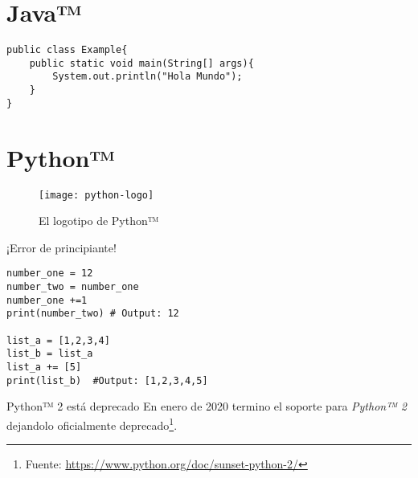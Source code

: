 \section{Java™}

\lipsum[2-3]

\begin{lstlisting}[frame=single]
public class Example{
    public static void main(String[] args){
        System.out.println("Hola Mundo");
    }
}
\end{lstlisting}

\lipsum[1-2]

\section{Python™}

\lipsum[1-2]

\begin{figure}[!htb]
    \centering
    \texttt{[image: python-logo]}
    \caption{El logotipo de Python™}
    \label{fig_u1_3}
\end{figure}


\lipsum[2-3]

\separation
\begin{alertblock}{¡Error de principiante!}
    \begin{lstlisting}[frame=single]
number_one = 12
number_two = number_one
number_one +=1
print(number_two) # Output: 12

list_a = [1,2,3,4]
list_b = list_a
list_a += [5]
print(list_b)  #Output: [1,2,3,4,5]

    \end{lstlisting}
\end{alertblock}

\separation
\lipsum[2-3]

\separation
\begin{infoblock}{Python™ 2 está deprecado}
En enero de 2020 termino el soporte para \textit{Python™ 2} dejandolo oficialmente deprecado\footnote{Fuente: \href{https://www.python.org/doc/sunset-python-2/}{https://www.python.org/doc/sunset-python-2/}}.
\end{infoblock}

